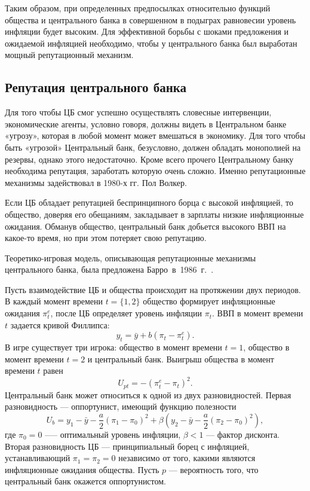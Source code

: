 \documentclass[14pt,a4paper, oneside]{extreport}
\begin{document}
Таким образом, при определенных предпосылках относительно функций общества и центрального банка в совершенном в подыграх равновесии уровень инфляции будет высоким. Для эффективной борьбы с шоками предложения и ожидаемой инфляцией необходимо, чтобы у центрального банка был выработан мощный репутационный механизм.

\subsection{Репутация центрального банка}

Для того чтобы ЦБ смог успешно осуществлять словесные интервенции, экономические агенты, условно говоря, должны видеть в Центральном банке «угрозу», которая в любой момент может вмешаться в экономику. Для того чтобы быть «угрозой» Центральный банк, безусловно, должен обладать монополией на резервы, однако этого недостаточно. Кроме всего прочего Центральному банку необходима репутация, заработать которую очень сложно. Именно репутационные механизмы задействовал в 1980-х гг. Пол Волкер.

Если ЦБ обладает репутацией беспринципного борца с высокой инфляцией, то общество, доверяя его обещаниям, закладывает в зарплаты низкие инфляционные ожидания. Обманув общество, центральный банк добьется высокого ВВП на какое-то время, но при этом потеряет свою репутацию. 

Теоретико-игровая модель, описывающая репутационные механизмы центрального банка, была предложена Барро~в~1986~г.~\cite{barro1986reputation}.

Пусть взаимодействие ЦБ и общества происходит на протяжении двух периодов. В каждый момент времени $t = \{1,2\}$ общество формирует инфляционные ожидания $\pi_t^e$, после ЦБ определяет уровень инфляции $\pi_t$. ВВП в момент времени $t$ задается
кривой Филлипса:
\begin{equation}
y_t = \bar{y} +b(\pi_t-\pi_t^e). 
\end{equation}
В игре существует три игрока: общество в момент времени $t = 1$, общество в момент времени
$t = 2$ и центральный банк. Выигрыш общества в момент времени $t$ равен
\begin{equation}
U_{pt}=-(\pi_t^e-\pi_t)^2.
\end{equation}
Центральный банк может относиться к одной из двух разновидностей. Первая разновидность — оппортунист, имеющий функцию полезности
\begin{equation}
U_b = y_1 - \bar y - \frac{a}{2} (\pi_1 - \pi_0)^2 + \beta (y_2 - \bar y - \frac{a}{2} (\pi_2 - \pi_0)^2),
\end{equation}
 где $\pi_0=0$ --— оптимальный уровень инфляции, $\beta <1$ --- фактор дисконта. Вторая разновидность ЦБ — принципиальный борец с инфляцией, устанавливающий
$\pi_1=\pi_2=0$ независимо от того, какими являются инфляционные ожидания общества. Пусть $p$ ---
вероятность того, что центральный банк окажется оппортунистом.
\end{document}
